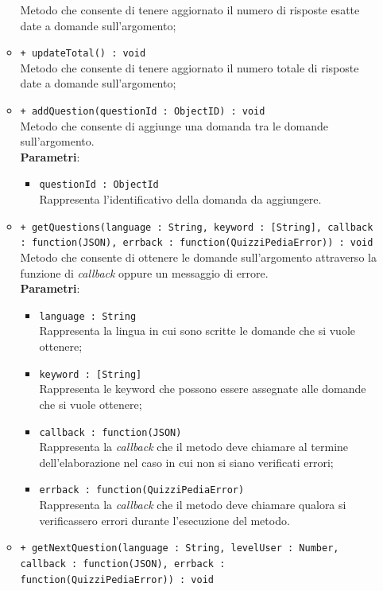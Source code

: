 \begin{itemize}
\begin{itemize}
			Metodo che consente di tenere aggiornato il numero di risposte esatte date a domande sull'argomento;
			\item \texttt{+ updateTotal() : void} \\
			Metodo che consente di tenere aggiornato il numero totale di risposte date a domande sull'argomento;
			\item \texttt{+ addQuestion(questionId : ObjectID) : void} \\
			Metodo che consente di aggiunge una domanda tra le domande sull'argomento. \\
			\textbf{Parametri}:
			\begin{itemize}
			\item \texttt{questionId : ObjectId} \\
			Rappresenta l'identificativo della domanda da aggiungere.
			\end{itemize}
			\item \texttt{+ getQuestions(language : String, keyword : [String], callback : function(JSON), errback : function(QuizziPediaError)) : void} \\
			Metodo che consente di ottenere le domande sull'argomento attraverso la funzione di \textit{callback} oppure un messaggio di errore. \\
			\textbf{Parametri}:
			\begin{itemize}
			\item \texttt{language : String} \\
			Rappresenta la lingua in cui sono scritte le domande che si vuole ottenere;
			\item \texttt{keyword : [String]} \\
			Rappresenta le keyword che possono essere assegnate alle domande che si vuole ottenere;
			\item \texttt{callback : function(JSON)} \\
			Rappresenta la \textit{callback} che il metodo deve chiamare al termine dell'elaborazione nel caso in cui non si siano verificati errori;
			\item \texttt{errback : function(QuizziPediaError)} \\
			Rappresenta la \textit{callback} che il metodo deve chiamare qualora si verificassero errori durante l'esecuzione del metodo.
			\end{itemize}
			\item \texttt{+ getNextQuestion(language : String, levelUser : Number, callback : function(JSON), errback : function(QuizziPediaError)) : void} \\

\end{itemize}
\end{itemize}
